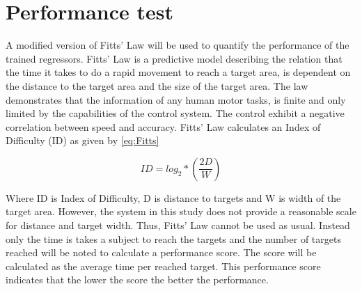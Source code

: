 \section{Performance test}

A modified version of Fitts' Law will be used to quantify the performance of the trained regressors. Fitts' Law is a predictive model describing the relation that the time it takes to do a rapid movement to reach a target area, is dependent on the distance to the target area and the size of the target area. The law demonstrates that the information of any human motor tasks, is finite and only limited by the capabilities of the control system. The control exhibit a negative correlation between speed and accuracy. \cite{Kamavuako2014}
Fitts' Law calculates an Index of Difficulty (ID) as given by \eqref{eq:Fitts}

\begin{equation} \label{eq:Fitts}
ID = log_{2} * (\frac{2D}{W})
\end{equation}

Where ID is Index of Difficulty, D is distance to targets and W is width of the target area. However, the system in this study does not provide a reasonable scale for distance and target width. Thus, Fitts' Law cannot be used as usual. Instead only the time is takes a subject to reach the targets and the number of targets reached will be noted to calculate a performance score. The score will be calculated as the average time per reached target.
This performance score indicates that the lower the score the better the performance.

